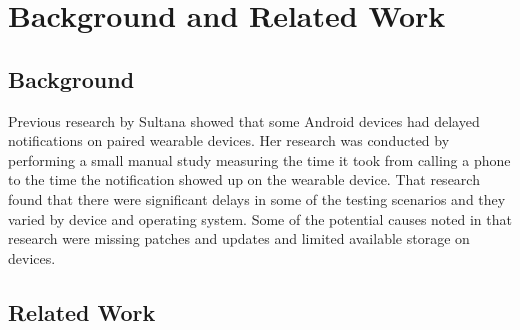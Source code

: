 \section{Background and Related Work}
\subsection{Background}

Previous research by Sultana\cite{sultana_wearable_nodate} showed that some Android devices had delayed notifications on paired wearable devices. 
Her research was conducted by performing a small manual study measuring the time it took from calling a phone to the time the notification showed up on the wearable device.
That research found that there were significant delays in some of the testing scenarios and they varied by device and operating system.
Some of the potential causes noted in that research were missing patches and updates and limited available storage on devices.
\subsection{Related Work}